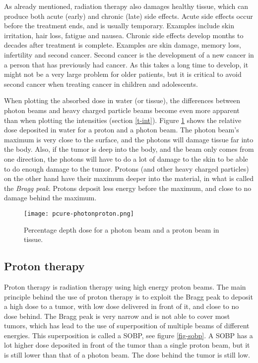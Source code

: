 \documentclass[../main/thesis.tex]{subfiles}
\begin{document}
As already mentioned, radiation therapy also damages healthy tissue, which can produce both acute (early) and chronic (late) side effects. Acute side effects occur before the treatment ends, and is usually temporary. Examples include skin irritation, hair loss, fatigue and nausea. Chronic side effects develop months to decades after treatment is complete. Examples are skin damage, memory loss, infertility and second cancer. Second cancer is the development of a new cancer in a person that has previously had cancer. As this takes a long time to develop, it might not be a very large problem for older patients, but it is critical to avoid second cancer when treating cancer in children and adolescents. \citep{nih} 

When plotting the absorbed dose in water (or tissue), the differences between photon beams and heavy charged particle beams become even more apparent than when plotting the intensities (section \ref{t-int}). Figure \ref{fig-photonproton} shows the relative dose deposited in water for a proton and a photon beam. The photon beam's maximum is very close to the surface, and the photons will damage tissue far into the body. Also, if the tumor is deep into the body, and the beam only comes from one direction, the photons will have to do a lot of damage to the skin to be able to do enough damage to the tumor. Protons (and other heavy charged particles) on the other hand have their maximum deeper into the material, in what is called the \textit{Bragg peak}. Protons deposit less energy before the maximum, and close to no damage behind the maximum. 

\begin{figure}%
	\centering
	\texttt{[image: pcure-photonproton.png]}
	\caption{Percentage depth dose for a photon beam and a proton beam in tissue. \citetext{\citeauthor{pcure}}}
	\label{fig-photonproton}
\end{figure}


\subsection{Proton therapy}
\label{t-proton}
Proton therapy is radiation therapy using high energy proton beams. The main principle behind the use of proton therapy is to exploit the Bragg peak to deposit a high dose to a tumor, with low dose delivered in front of it, and close to no dose behind. The Bragg peak is very narrow and is not able to cover most tumors, which has lead to the use of superposition of multiple beams of different energies. This superposition is called a \gls{SOBP}, see figure \ref{fig-sobp}. A \gls{SOBP} has a lot higher dose deposited in front of the tumor than a single proton beam, but it is still lower than that of a photon beam. The dose behind the tumor is still low. \citep[chap. 27]{Khan}
\end{document}
